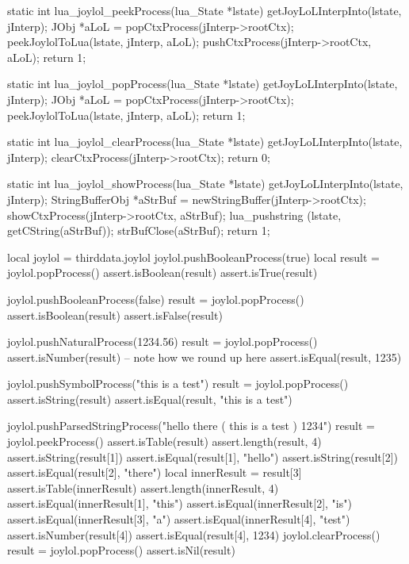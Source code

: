 static int lua_joylol_peekProcess(lua_State *lstate) {
  getJoyLoLInterpInto(lstate, jInterp);
  JObj *aLoL = popCtxProcess(jInterp->rootCtx);
  peekJoylolToLua(lstate, jInterp, aLoL);
  pushCtxProcess(jInterp->rootCtx, aLoL);
  return 1;
}

static int lua_joylol_popProcess(lua_State *lstate) {
  getJoyLoLInterpInto(lstate, jInterp);
  JObj *aLoL = popCtxProcess(jInterp->rootCtx);
  peekJoylolToLua(lstate, jInterp, aLoL);
  return 1;
}

static int lua_joylol_clearProcess(lua_State *lstate) {
  getJoyLoLInterpInto(lstate, jInterp);
  clearCtxProcess(jInterp->rootCtx);
  return 0;
}

static int lua_joylol_showProcess(lua_State *lstate) {
  getJoyLoLInterpInto(lstate, jInterp);
  StringBufferObj *aStrBuf = newStringBuffer(jInterp->rootCtx);
  showCtxProcess(jInterp->rootCtx, aStrBuf);
  lua_pushstring (lstate, getCString(aStrBuf));
  strBufClose(aStrBuf);
  return 1;
}
\stopCCode

\startLuaTest
  local joylol = thirddata.joylol
  joylol.pushBooleanProcess(true)
  local result = joylol.popProcess()
  assert.isBoolean(result)
  assert.isTrue(result)
  
  joylol.pushBooleanProcess(false)
  result = joylol.popProcess()
  assert.isBoolean(result)
  assert.isFalse(result)
  
  joylol.pushNaturalProcess(1234.56)
  result = joylol.popProcess()
  assert.isNumber(result)
  -- note how we round up here
  assert.isEqual(result, 1235)
  
  joylol.pushSymbolProcess("this is a test")
  result = joylol.popProcess()
  assert.isString(result)
  assert.isEqual(result, "this is a test")

  joylol.pushParsedStringProcess("hello there ( this is a test ) 1234")
  result = joylol.peekProcess()
  assert.isTable(result)
  assert.length(result, 4)
  assert.isString(result[1])
  assert.isEqual(result[1], "hello")
  assert.isString(result[2])
  assert.isEqual(result[2], "there")
  local innerResult = result[3]
  assert.isTable(innerResult)
  assert.length(innerResult, 4)
  assert.isEqual(innerResult[1], "this")
  assert.isEqual(innerResult[2], "is")
  assert.isEqual(innerResult[3], "a")
  assert.isEqual(innerResult[4], "test")
  assert.isNumber(result[4])
  assert.isEqual(result[4], 1234)
  joylol.clearProcess()
  result = joylol.popProcess()
  assert.isNil(result)
\stopLuaTest
\stopTestCase
\stopTestSuite

